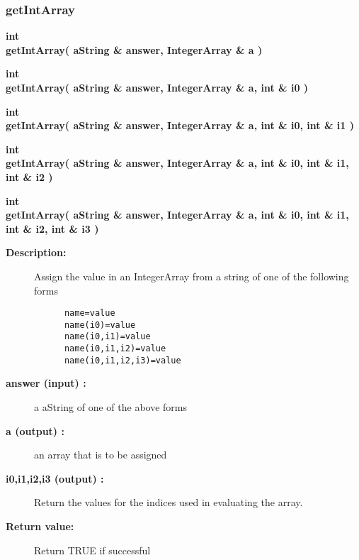 \subsubsection{getIntArray}
 
\begin{flushleft} \textbf{%
int  \\ 
\settowidth{\NameListIncludeArgIndent}{getIntArray(}%
getIntArray( aString \& answer, IntegerArray \& a )
}\end{flushleft}

 
\begin{flushleft} \textbf{%
int  \\ 
\settowidth{\NameListIncludeArgIndent}{getIntArray(}%
getIntArray( aString \& answer, IntegerArray \& a, int \& i0 )
}\end{flushleft}

 
\begin{flushleft} \textbf{%
int  \\ 
\settowidth{\NameListIncludeArgIndent}{getIntArray(}%
getIntArray( aString \& answer, IntegerArray \& a, int \& i0, int \& i1 )
}\end{flushleft}

 
\begin{flushleft} \textbf{%
int  \\ 
\settowidth{\NameListIncludeArgIndent}{getIntArray(}%
getIntArray( aString \& answer, IntegerArray \& a, int \& i0, int \& i1, int \& i2 )
}\end{flushleft}

 
\begin{flushleft} \textbf{%
int  \\ 
\settowidth{\NameListIncludeArgIndent}{getIntArray(}%
getIntArray( aString \& answer, IntegerArray \& a, int \& i0, int \& i1, int \& i2, int \& i3 )
}\end{flushleft}
\begin{description}
\item[{\bf Description:}]  
 Assign the value in an IntegerArray from a string of
 one of the following forms
 \begin{verbatim}
      name=value
      name(i0)=value  
      name(i0,i1)=value
      name(i0,i1,i2)=value
      name(i0,i1,i2,i3)=value
 \end{verbatim}
\item[{\bf answer (input) :}]  a aString of one of the above forms
\item[{\bf a (output) :}]  an array that is to be assigned
\item[{\bf i0,i1,i2,i3 (output) :}]  Return the values for the indices used in evaluating the array.
\item[{\bf Return value:}]  Return TRUE if successful
\end{description}

